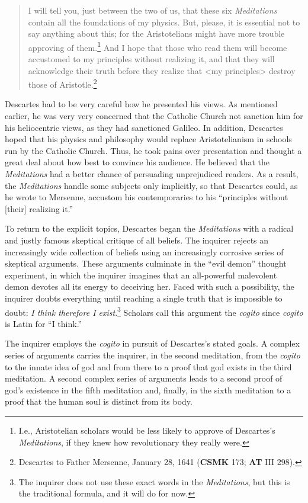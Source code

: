 \begin{quote}
    I will tell you, just between the two of us, that these six \textit{Meditations} contain all the foundations of my physics. But, please, it is essential not to say anything about this; for the Aristotelians might have more trouble approving of them.\footnote{I.e., Aristotelian scholars would be less likely to approve of Descartes's \textit{Meditations}, if they knew how revolutionary they really were.} And I hope that those who read them will become accustomed to my principles without realizing it, and that they will acknowledge their truth before they realize that <my principles> destroy those of Aristotle.\footnote{Descartes to Father Mersenne, January 28, 1641 (\textbf{CSMK} 173; \textbf{AT} III 298).}
\end{quote}

Descartes had to be very careful how he presented his views. As mentioned earlier, he was very very concerned that the Catholic Church not sanction him for his heliocentric views, as they had sanctioned Galileo. In addition, Descartes hoped that his physics and philosophy would replace Aristotelianism in schools run by the Catholic Church. Thus, he took pains over presentation and thought a great deal about how best to convince his audience. He believed that the \textit{Meditations} had a better chance of persuading unprejudiced readers. As a result, the \textit{Meditations} handle some subjects only implicitly, so that Descartes could, as he wrote to Mersenne, accustom his contemporaries to his ``principles without [their] realizing it.''

To return to the explicit topics, Descartes began the \textit{Meditations} with a radical and justly famous skeptical critique of all beliefs. The inquirer rejects an increasingly wide collection of beliefs using an increasingly corrosive series of skeptical arguments. These arguments culminate in the ``evil demon'' thought experiment, in which the inquirer imagines that an all-powerful malevolent demon devotes all its energy to deceiving her. Faced with such a possibility, the inquirer doubts everything until reaching a single truth that is impossible to doubt: \textit{I think therefore I exist}.\footnote{The inquirer does not use these exact words in the \textit{Meditations}, but this is the traditional formula, and it will do for now.} Scholars call this argument the \textit{cogito} since \textit{cogito} is Latin for ``I think.''

The inquirer employs the \textit{cogito} in pursuit of Descartes's stated goals. A complex series of arguments carries the inquirer, in the second meditation, from the \textit{cogito} to the innate idea of god and from there to a proof that god exists in the third meditation. A second complex series of arguments leads to a second proof of god's existence in the fifth meditation and, finally, in the sixth meditation to a proof that the human soul is distinct from its body.

